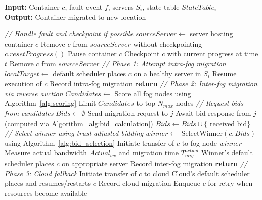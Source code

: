 \documentclass{article}
\begin{document}
\begin{algorithm}[h!]
\caption{Collaborative Migration Workflow at Fog Node $i$}
\label{alg:migration_workflow}
 \textbf{Input:} Container $c$, fault event $f$, servers $S_i$, state table $StateTable_i$
\\ \textbf{Output:} Container migrated to new location
\begin{algorithmic}[1]
\State \textit{// Handle fault and checkpoint if possible}
\State $sourceServer \gets$ server hosting container $c$
    \State Remove $c$ from $sourceServer$ without checkpointing
    \State $c.resetProgress()$ 
\Else 
    \State Pause container $c$
    \State Checkpoint $c$ with current progress at time $t$ 
    \State Remove $c$ from $sourceServer$
\EndIf
\State
\State \textit{// Phase 1: Attempt intra-fog migration}
\State $localTarget \gets$ default scheduler places $c$ on a healthy server in $S_i$
    \State Resume execution of $c$
    \State Record intra-fog migration
    \State \textbf{return}
\EndIf
\State
\State \textit{// Phase 2: Inter-fog migration via reverse auction}
\State $Candidates \gets$ Score all fog nodes using Algorithm~\ref{alg:scoring}
\State Limit $Candidates$ to top $N_{max}$ nodes
\State
\State \textit{// Request bids from candidates}
\State $Bids \gets \emptyset$
    \State Send migration request to $j$
    \State Await bid response from $j$ (computed via Algorithm~\ref{alg:bid_calculation})
    \State $Bids \gets Bids \cup \{$ received bid$\}$
\EndFor
\State
\State \textit{// Select winner using trust-adjusted bidding}
\State $winner \gets$ SelectWinner$(c, Bids)$ using Algorithm~\ref{alg:bid_selection}
    \State Initiate transfer of $c$ to fog node $winner$
    \State Measure actual bandwidth $Actual_{bw}$ and migration time $T^{actual}_{mig}$
    \State Winner's default scheduler places $c$ on appropriate server
    \State Record inter-fog migration
    \State \textbf{return}
\EndIf
\State
\State \textit{// Phase 3: Cloud fallback}
    \State Initiate transfer of $c$ to cloud
    \State Cloud's default scheduler places and resumes/restarts $c$
    \State Record cloud migration
\Else
    \State Enqueue $c$ for retry when resources become available
\EndIf
\end{algorithmic}
\end{algorithm}
\end{document}
